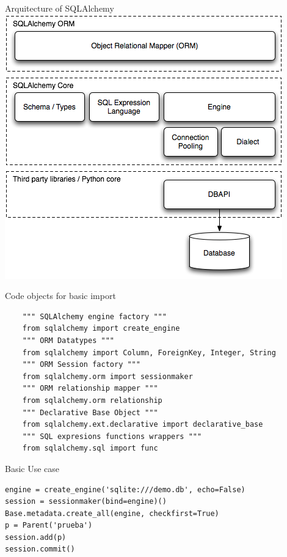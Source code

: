 \documentclass[seagull]{beamer}
\begin{document}
\begin{frame}{Arquitecture of SQLAlchemy}
	\centering\includegraphics[scale=0.5]{sqla-arch.png}
\end{frame}

\begin{frame}[fragile]{Code objects for basic import}
\begin{verbatim}
	""" SQLAlchemy engine factory """
	from sqlalchemy import create_engine
	""" ORM Datatypes """ 
	from sqlalchemy import Column, ForeignKey, Integer, String
	""" ORM Session factory """ 
	from sqlalchemy.orm import sessionmaker
	""" ORM relationship mapper """ 
	from sqlalchemy.orm relationship
	""" Declarative Base Object """ 
	from sqlalchemy.ext.declarative import declarative_base
	""" SQL expresions functions wrappers """ 
	from sqlalchemy.sql import func
\end{verbatim}
\end{frame}

\begin{frame}[fragile]{Basic Use case}
\begin{verbatim}
engine = create_engine('sqlite:///demo.db', echo=False)
session = sessionmaker(bind=engine)()
Base.metadata.create_all(engine, checkfirst=True)
p = Parent('prueba')
session.add(p)
session.commit()
\end{verbatim}
\end{frame}
\end{document}
